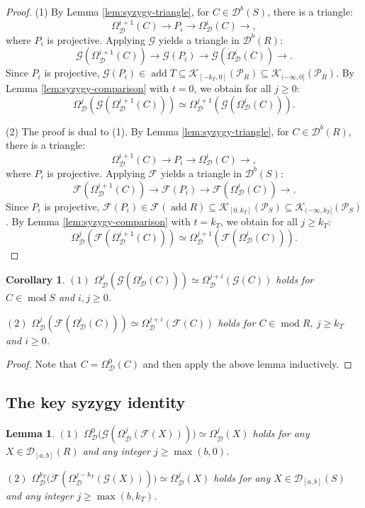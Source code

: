 \documentclass[12pt,a4paper,reqno]{amsart}
\theoremstyle{plain}
\newtheorem{lemma}[theorem]{Lemma}
\newtheorem{corollary}[theorem]{Corollary}
\theoremstyle{definition}
\theoremstyle{remark}
\DeclareMathOperator{\modd}{mod}
\DeclareMathOperator{\add}{add}
\newcommand{\Db}{\mathcal{D}^b}
\newcommand{\K}{\mathcal{K}}
\newcommand{\PR}{\mathcal{P}_R}
\newcommand{\PS}{\mathcal{P}_S}
\newcommand{\syz}{\Omega_{\mathcal{D}}}
\begin{document}
\begin{proof} (1)
By Lemma \ref{lem:syzygy-triangle}, for $C\in \Db(S)$, there is a triangle:
\[
\syz^{i+1}(C) \longrightarrow P_i \longrightarrow \syz^i(C) \longrightarrow,
\]
where $P_i$ is projective. Applying $\mathcal{G}$ yields a triangle in $\Db(R)$:
\[
\mathcal{G}(\syz^{i+1}(C)) \longrightarrow \mathcal{G}(P_i) \longrightarrow \mathcal{G}(\syz^i(C)) \longrightarrow.
\]
Since $P_i$ is projective, $\mathcal{G}(P_i) \in \add T \subseteq \K_{[-k_T,0]}(\PR) \subseteq \K_{(-\infty,0]}(\PR)$. By Lemma \ref{lem:syzygy-comparison} with $t = 0$, we obtain for all $j \geq 0$:
\[
\syz^j(\mathcal{G}(\syz^{i+1}(C))) \simeq \syz^{j+1}(\mathcal{G}(\syz^i(C))).
\]

(2) The proof is dual to (1). By Lemma \ref{lem:syzygy-triangle}, for $C\in \Db(R)$, there is a triangle:
\[
\syz^{i+1}(C) \longrightarrow P_i \longrightarrow \syz^i(C) \longrightarrow,
\]
where $P_i$ is projective. Applying $\mathcal{F}$ yields a triangle in $\Db(S)$:
\[
\mathcal{F}(\syz^{i+1}(C)) \longrightarrow \mathcal{F}(P_i) \longrightarrow \mathcal{F}(\syz^i(C)) \longrightarrow.
\]
Since $P_i$ is projective, $\mathcal{F}(P_i) \in \mathcal{F}(\add R) \subseteq \K_{[0,k_T]}(\PS) \subseteq \K_{(-\infty,k_T]}(\PS)$. By Lemma \ref{lem:syzygy-comparison} with $t = k_T$, we obtain for all $j \geq k_T$:
\[
\syz^j(\mathcal{F}(\syz^{i+1}(C))) \simeq \syz^{j+1}(\mathcal{F}(\syz^i(C))).
\]
\end{proof}

\begin{corollary} \label{cor:iterative-syzygy}
$(1)$
\(
\syz^j(\mathcal{G}(\syz^i(C))) \simeq \syz^{j+i}(\mathcal{G}(C)) 
\) holds for $C \in \modd S$ and $i,j \geq 0$.

$(2)$ 
\(
\syz^j(\mathcal{F}(\syz^i(C))) \simeq \syz^{j+i}(\mathcal{F}(C))
\) holds for $C \in \modd R$, $j \geq k_T$ and $i\ge 0$.
\end{corollary}

\begin{proof}
Note that $C=\syz^0(C)$ and then apply the above lemma inductively. 
\end{proof}

\subsection{The key syzygy identity}

\begin{lemma} \label{lem:key-syzygy}
$(1)$ 
\(
\syz^{0}\bigl(\mathcal G(\syz^{j}(\mathcal F(X)))\bigr) \simeq \syz^{j}(X)
\) holds for any $X \in \mathcal D_{[a,b]}(R)$ and any integer $j \ge \max(b,0)$.

$(2)$ 
\(
\syz^{k_T}\bigl(\mathcal F(\syz^{j-k_T}(\mathcal G(X)))\bigr) \simeq \syz^{j}(X)
\) holds for any $X \in \mathcal D_{[a,b]}(S)$ and any integer $j \ge \max(b,k_T)$.
\end{lemma}
\end{document}
